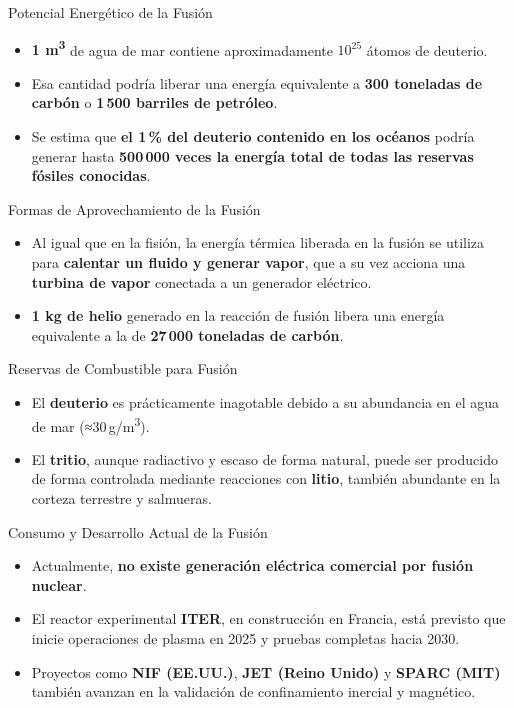 \documentclass[main.tex]{subfiles}
\begin{document}
\begin{frame}{Potencial Energético de la Fusión}
    \begin{itemize}
        \item \textbf{1 m\textsuperscript{3}} de agua de mar contiene aproximadamente $10^{25}$ átomos de deuterio.
        \item Esa cantidad podría liberar una energía equivalente a \textbf{300 toneladas de carbón} o \textbf{1\,500 barriles de petróleo}.
        \item Se estima que \textbf{el 1\,\% del deuterio contenido en los océanos} podría generar hasta \textbf{500\,000 veces la energía total de todas las reservas fósiles conocidas}.
    \end{itemize}
\end{frame}


\begin{frame}{Formas de Aprovechamiento de la Fusión}
    \begin{itemize}
        \item Al igual que en la fisión, la energía térmica liberada en la fusión se utiliza para \textbf{calentar un fluido y generar vapor}, que a su vez acciona una \textbf{turbina de vapor} conectada a un generador eléctrico.
        \item \textbf{1 kg de helio} generado en la reacción de fusión libera una energía equivalente a la de \textbf{27\,000 toneladas de carbón}.
    \end{itemize}
\end{frame}


\begin{frame}{Reservas de Combustible para Fusión}
    \begin{itemize}
        \item El \textbf{deuterio} es prácticamente inagotable debido a su abundancia en el agua de mar (≈30 g/m\textsuperscript{3}).
        \item El \textbf{tritio}, aunque radiactivo y escaso de forma natural, puede ser producido de forma controlada mediante reacciones con \textbf{litio}, también abundante en la corteza terrestre y salmueras.
    \end{itemize}
\end{frame}


\begin{frame}{Consumo y Desarrollo Actual de la Fusión}
    \begin{itemize}
        \item Actualmente, \textbf{no existe generación eléctrica comercial por fusión nuclear}.
        \item El reactor experimental \textbf{ITER}, en construcción en Francia, está previsto que inicie operaciones de plasma en 2025 y pruebas completas hacia 2030.
        \item Proyectos como \textbf{NIF (EE.UU.)}, \textbf{JET (Reino Unido)} y \textbf{SPARC (MIT)} también avanzan en la validación de confinamiento inercial y magnético.
    \end{itemize}
\end{frame}
\end{document}
